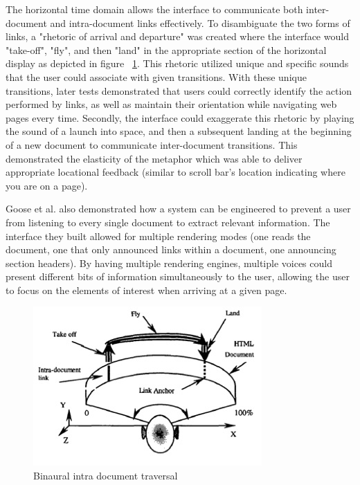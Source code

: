 The horizontal time domain allows the interface to communicate both inter-document
and intra-document links effectively.  To disambiguate the two forms of links,
a "rhetoric of arrival and departure" was created where the interface would
"take-off", "fly", and then "land" in the appropriate section of the horizontal
display as depicted in figure ~\ref{fig:goose_intra}. This rhetoric utilized
unique and specific sounds that the user could associate with given transitions.
With these unique transitions, later tests demonstrated that users could
correctly identify the action performed by links, as well as maintain their
orientation while navigating web pages every time.  Secondly, the interface
could exaggerate this rhetoric by playing the sound of a launch into space,
and then a subsequent landing at the beginning of a new document to
communicate inter-document transitions. This demonstrated the elasticity of
the metaphor which was able to deliver appropriate locational feedback
(similar to scroll bar's location indicating where you are on a page).

Goose et al. also demonstrated how a system can be engineered to prevent a
user from listening to every single document to extract relevant information.
The interface they built allowed for multiple rendering modes (one reads the
document, one that only announced links within a document,  one announcing
section headers).  By having multiple rendering engines, multiple voices
could present different bits of information simultaneously to the user,
allowing the user to focus on the elements of interest when arriving at a
given page.

\begin{figure}[t]
    \centering
    \includegraphics[width=.7\linewidth]{images/goose_intra.jpg}
    \caption{Binaural intra document traversal}
    \label{fig:goose_intra}
\end{figure}

